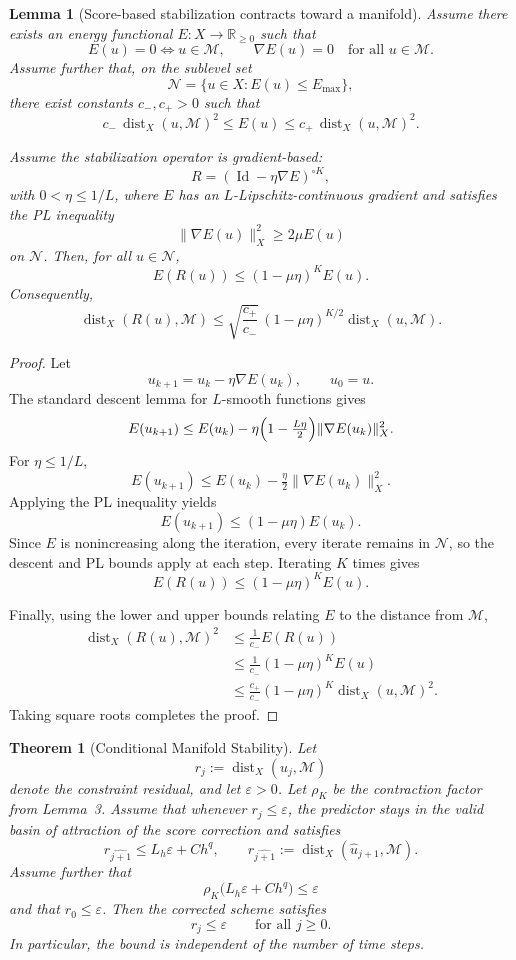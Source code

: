 \documentclass[letterpaper]{article} %
\newtheorem{lemma}{Lemma}
\newtheorem{theorem}{Theorem}
\begin{document}
\begin{lemma}[Score-based stabilization contracts toward a manifold]
Assume there exists an energy functional
$E:X\to\mathbb{R}_{\ge 0}$ such that
\[
E(u)=0 \iff u\in\mathcal{M},
\qquad
\nabla E(u)=0
\quad \text{for all } u\in\mathcal{M}.
\]
Assume further that, on the sublevel set
\[
\mathcal{N}=\{u\in X:E(u)\le E_{\max}\},
\]
there exist constants $c_-,c_+>0$ such that
\[
c_-\,\operatorname{dist}_X(u,\mathcal{M})^2
\le E(u)
\le
c_+\,\operatorname{dist}_X(u,\mathcal{M})^2.
\]

Assume the stabilization operator is gradient-based:
\[
R=(\operatorname{Id}-\eta\nabla E)^{\circ K},
\]
with $0<\eta\le 1/L$, where $E$ has an
$L$-Lipschitz-continuous gradient and satisfies the PL inequality
\[
\|\nabla E(u)\|_X^2 \ge 2\mu E(u)
\]
on $\mathcal{N}$. Then, for all $u\in\mathcal{N}$,
\[
E(R(u))\le (1-\mu\eta)^K E(u).
\]
Consequently,
\[
\operatorname{dist}_X(R(u),\mathcal{M})
\le
\sqrt{\frac{c_+}{c_-}}\,
(1-\mu\eta)^{K/2}
\operatorname{dist}_X(u,\mathcal{M}).
\]
\end{lemma}

\begin{proof}
Let
\[
u_{k+1}=u_k-\eta\nabla E(u_k),
\qquad u_0=u.
\]
The standard descent lemma for $L$-smooth functions gives
\[
E(u_{k+1})
\le
E(u_k)
-\eta\Bigl(1-\tfrac{L\eta}{2}\Bigr)
\|\nabla E(u_k)\|_X^2.
\]
For $\eta\le 1/L$,
\[
E(u_{k+1})
\le
E(u_k)-\tfrac{\eta}{2}\|\nabla E(u_k)\|_X^2.
\]
Applying the PL inequality yields
\[
E(u_{k+1})
\le
(1-\mu\eta)E(u_k).
\]
Since $E$ is nonincreasing along the iteration, every iterate remains
in $\mathcal{N}$, so the descent and PL bounds apply at each step.
Iterating $K$ times gives
\[
E(R(u))\le (1-\mu\eta)^K E(u).
\]

Finally, using the lower and upper bounds relating $E$ to the distance
from $\mathcal{M}$,
\[
\begin{split}
\operatorname{dist}_X(R(u),\mathcal{M})^2
&\le \frac{1}{c_-}E(R(u)) \\
&\le
\frac{1}{c_-}(1-\mu\eta)^K E(u) \\
&\le
\frac{c_+}{c_-}(1-\mu\eta)^K
\operatorname{dist}_X(u,\mathcal{M})^2.
\end{split}
\]
Taking square roots completes the proof.
\end{proof}

\begin{theorem}[Conditional Manifold Stability]
Let
\[
r_j:=\operatorname{dist}_X(u_j,\mathcal{M})
\]
denote the constraint residual, and let $\varepsilon>0$. Let $\rho_K$ be
the contraction factor from Lemma~3. Assume that whenever
$r_j\le\varepsilon$, the predictor stays in the valid basin of attraction
of the score correction and satisfies
\[
r_{\widehat{j+1}}
\le L_h\varepsilon+Ch^q,
\qquad
r_{\widehat{j+1}}
:=
\operatorname{dist}_X(\widehat{u}_{j+1},\mathcal{M}).
\]
Assume further that
\[
\rho_K\bigl(L_h\varepsilon+Ch^q\bigr)\le\varepsilon
\]
and that $r_0\le\varepsilon$. Then the corrected scheme satisfies
\[
r_j\le\varepsilon
\qquad\text{for all } j\ge0.
\]
In particular, the bound is independent of the number of time steps.
\end{theorem}
\end{document}
